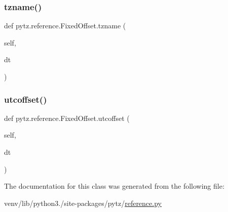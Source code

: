 \mbox{\label{classpytz_1_1reference_1_1FixedOffset_a6854398a80fcaaf428af2f5bbe7078e5}} 
\subsubsection{\texorpdfstring{tzname()}{tzname()}}
{\footnotesize\ttfamily def pytz.\+reference.\+Fixed\+Offset.\+tzname (\begin{DoxyParamCaption}\item[{}]{self,  }\item[{}]{dt }\end{DoxyParamCaption})}

\mbox{\label{classpytz_1_1reference_1_1FixedOffset_abc4bd2c7fec146926cb626eae4952f10}} 
\subsubsection{\texorpdfstring{utcoffset()}{utcoffset()}}
{\footnotesize\ttfamily def pytz.\+reference.\+Fixed\+Offset.\+utcoffset (\begin{DoxyParamCaption}\item[{}]{self,  }\item[{}]{dt }\end{DoxyParamCaption})}



The documentation for this class was generated from the following file\+:\begin{DoxyCompactItemize}
\item 
venv/lib/python3./site-\/packages/pytz/\hyperlink{reference_8py}{reference.\+py}\end{DoxyCompactItemize}
